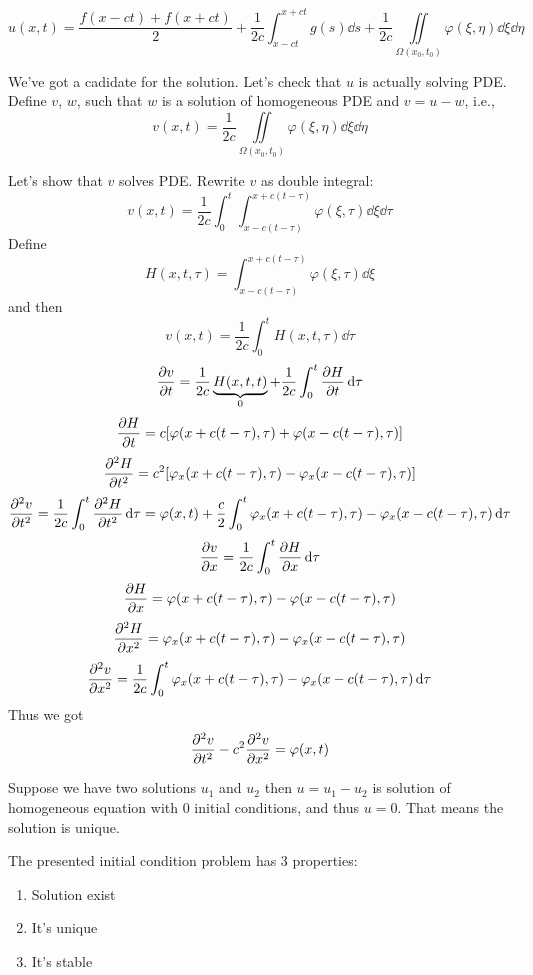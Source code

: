 $$u(x,t) = \frac{f(x-ct) + f(x+ct) }{2} + \frac{1}{2c}\int_{x-ct}^{x+ct} g(s) \dd{s} + \frac{1}{2c}\iint\limits_{\Omega(x_0, t_0)} \varphi(\xi, \eta) \dd{\xi} \dd{\eta}$$

We've got a cadidate for the solution. Let's check that $u$ is actually solving PDE. Define $v$, $w$, such that $w$ is a solution of homogeneous PDE and $v=u-w$, i.e.,
$$v(x,t) = \frac{1}{2c}\iint\limits_{\Omega(x_0, t_0)} \varphi(\xi, \eta) \dd{\xi} \dd{\eta}$$

Let's show that $v$ solves PDE. Rewrite $v$ as double integral:
$$v(x,t) = \frac{1}{2c}\int_0^t \int_{x-c(t-\tau)}^{x+c(t-\tau)} \varphi(\xi, \tau) \dd{\xi} \dd{\tau}$$
Define
$$H(x,t,\tau) = \int_{x-c(t-\tau)}^{x+c(t-\tau)} \varphi(\xi, \tau) \dd{\xi}$$
and then
$$v(x,t) = \frac{1}{2c} \int_0^t H(x,t,\tau) \dd{\tau}$$
$$\pdv{v}{t} = \frac{1}{2c} \underbrace{H(x,t,t)}_{0} +\frac{1}{2c} \int_0^t \pdv{H}{t}(x,t,\tau) \dd{\tau}$$
$$\pdv{H}{t} =c[\varphi(x+c(t-\tau), \tau) + \varphi(x-c(t-\tau), \tau) ]$$
$$\pdv[2]{H}{t} =c^2[\varphi_x(x+c(t-\tau), \tau) - \varphi_x(x-c(t-\tau), \tau) ]$$
$$\pdv[2]{v}{t} =\frac{1}{2c} \int_0^t \pdv[2]{H}{t}(x,t,\tau) \dd{\tau} =  \varphi(x,t) + \frac{c}{2} \int_0^t \varphi_x(x+c(t-\tau), \tau) - \varphi_x(x-c(t-\tau), \tau)  \dd{\tau} $$
$$\pdv{v}{x} = \frac{1}{2c} \int_0^t \pdv{H}{x} \dd{\tau}$$
$$\pdv{H}{x} = \varphi(x+c(t-\tau),\tau) - \varphi(x-c(t-\tau),\tau)$$
$$\pdv[2]{H}{x} = \varphi_x(x+c(t-\tau),\tau) - \varphi_x(x-c(t-\tau),\tau)$$
$$\pdv[2]{v}{x} = \frac{1}{2c} \int_0^t \varphi_x(x+c(t-\tau),\tau) - \varphi_x(x-c(t-\tau),\tau) \dd{\tau}$$
Thus we got
$$\pdv[2]{v}{t} - c^2\pdv[2]{v}{x} = \varphi(x,t)$$

Suppose we have two solutions $u_1$ and $u_2$ then $u=u_1-u_2$ is solution of homogeneous equation with $0$ initial conditions, and thus $u=0$. That means the solution is unique.

The presented initial condition problem has 3 properties:
\begin{enumerate}
	\item Solution exist
	\item It's unique
	\item It's stable
\end{enumerate}
